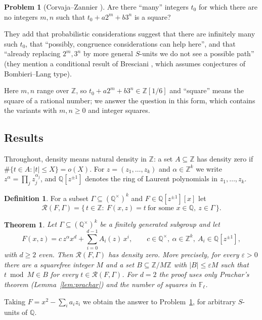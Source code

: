 \documentclass[11pt]{amsart}
\newtheorem{theorem}{Theorem}
\theoremstyle{definition}
\newtheorem{definition}[lemma]{Definition}
\newtheorem{problem}[lemma]{Problem}
\theoremstyle{remark}
\newcommand{\Z}{\mathbb{Z}}
\newcommand{\Q}{\mathbb{Q}}
\newcommand{\F}{\mathbb{F}}
\newcommand{\R}{\mathcal{R}}
\begin{document}
\begin{problem}[Corvaja--Zannier {\cite[after Example~1.3]{CZ26}}]\label{prob:CZ}
Are there ``many'' integers $t_0$ for which there are no integers $m,n$ such that $t_0+a2^m+b3^n$ is a square?
\end{problem}

They add that probabilistic considerations suggest that there are infinitely many such $t_0$, that ``possibly, congruence considerations can help here'', and that ``already replacing $2^m,3^n$ by more general $S$-units we do not see a possible path'' (they mention a conditional result of Bresciani \cite{Bre25}, which assumes conjectures of Bombieri--Lang type).

Here $m,n$ range over $\Z$, so $t_0+a2^m+b3^n\in\Z[1/6]$ and ``square'' means the square of a rational number; we answer the question in this form, which contains the variants with $m,n\ge0$ and integer squares.

\subsection{Results}
Throughout, density means natural density in $\Z$: a set $A\subseteq\Z$ has density zero if $\#\{t\in A:|t|\le X\}=o(X)$.
For $z=(z_1,\dots,z_k)$ and $\alpha\in\Z^k$ we write $z^\alpha=\prod_jz_j^{\alpha_j}$, and $\Q[z^{\pm1}]$ denotes the ring of Laurent polynomials in $z_1,\dots,z_k$.

\begin{definition}
For a subset $\Gamma\subseteq(\Q^\times)^k$ and $F\in\Q[z^{\pm1}][x]$ let
\[
\R(F,\Gamma)=\{\,t\in\Z:\ F(x,z)=t\ \text{for some }x\in\Q,\ z\in\Gamma\,\}.
\]
\end{definition}

\begin{theorem}\label{thm:A}
Let $\Gamma\subseteq(\Q^\times)^k$ be a finitely generated subgroup and let
\[
F(x,z)=c\,z^\alpha x^d+\sum_{i=0}^{d-1}A_i(z)\,x^i,\qquad c\in\Q^\times,\ \alpha\in\Z^k,\ A_i\in\Q[z^{\pm1}],
\]
with $d\ge2$ even.
Then $\R(F,\Gamma)$ has density zero.
More precisely, for every $\varepsilon>0$ there are a squarefree integer $M$ and a set $B\subseteq\Z/M\Z$ with $|B|\le\varepsilon M$ such that $t\bmod M\in B$ for every $t\in\R(F,\Gamma)$.
For $d=2$ the proof uses only Prachar's theorem (Lemma~\ref{lem:prachar}) and the number of squares in $\F_\ell$.
\end{theorem}

Taking $F=x^2-\sum_ia_iz_i$ we obtain the answer to Problem~\ref{prob:CZ}, for arbitrary $S$-units of $\Q$.
\end{document}
